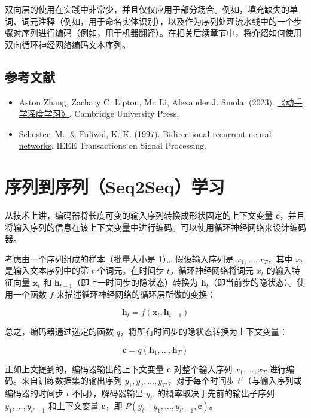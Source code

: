 双向层的使用在实践中非常少，并且仅仅应用于部分场合。例如，填充缺失的单词、词元注释（例如，用于命名实体识别），以及作为序列处理流水线中的一个步骤对序列进行编码（例如，用于机器翻译）。在相关后续章节中，将介绍如何使用双向循环神经网络编码文本序列。

\hypertarget{ux53c2ux8003ux6587ux732e-21}{%
\subsection{参考文献}\label{ux53c2ux8003ux6587ux732e-21}}

\begin{itemize}
\tightlist
\item
  Aston Zhang, Zachary C. Lipton, Mu Li, Alexander J. Smola. (2023). \href{https://zh.d2l.ai/}{《动手学深度学习》}. Cambridge University Press.
\item
  Schuster, M., \& Paliwal, K. K. (1997). \href{https://doi.org/10.1109/78.650093}{Bidirectional recurrent neural networks}. IEEE Transactions on Signal Processing.
\end{itemize}

\clearpage

\hypertarget{ux5e8fux5217ux5230ux5e8fux5217seq2sequx5b66ux4e60}{%
\section{序列到序列（Seq2Seq）学习}\label{ux5e8fux5217ux5230ux5e8fux5217seq2sequx5b66ux4e60}}

从技术上讲，编码器将长度可变的输入序列转换成形状固定的上下文变量 \(\mathbf{c}\)，并且将输入序列的信息在该上下文变量中进行编码。可以使用循环神经网络来设计编码器。

考虑由一个序列组成的样本（批量大小是 1）。假设输入序列是 \(x_1,\ldots,x_T\)，其中 \(x_t\) 是输入文本序列中的第 \(t\) 个词元。在时间步 \(t\)，循环神经网络将词元 \(x_t\) 的输入特征向量 \(\mathbf{x}_t\) 和 \(\mathbf{h}_{t-1}\)（即上一时间步的隐状态）转换为 \(\mathbf{h}_t\)（即当前步的隐状态）。使用一个函数 \(f\) 来描述循环神经网络的循环层所做的变换：

\[
\mathbf{h}_t = f(\mathbf{x}_t,\mathbf{h}_{t-1})
\]

总之，编码器通过选定的函数 \(q\)，将所有时间步的隐状态转换为上下文变量：

\[
\mathbf{c} = q(\mathbf{h}_1,\ldots,\mathbf{h}_T)
\]

正如上文提到的，编码器输出的上下文变量 \(\mathbf{c}\) 对整个输入序列 \(x_1,\ldots,x_T\) 进行编码。来自训练数据集的输出序列 \(y_1,y_2,\ldots,y_{T'}\)，对于每个时间步 \(t'\)（与输入序列或编码器的时间步 \(t\) 不同），解码器输出 \(y_{t'}\) 的概率取决于先前的输出子序列 \(y_1,\ldots,y_{t'-1}\) 和上下文变量 \(\mathbf{c}\)，即 \(P(y_{t'} \mid y_1,\ldots,y_{t'-1},\mathbf{c})\)。

